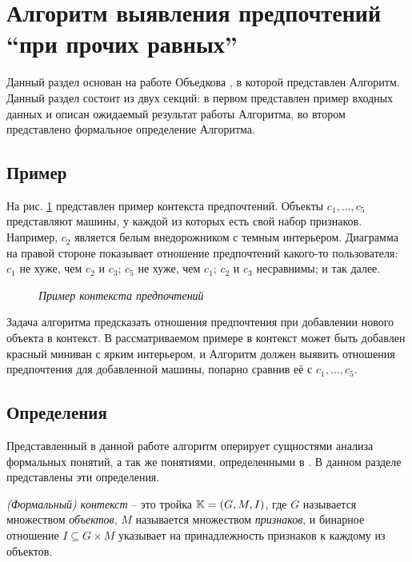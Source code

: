 	
\section{Алгоритм выявления предпочтений \enquote{при прочих равных}}

	Данный раздел основан на работе Объедкова \cite{Obiedkov:2013}, в которой представлен Алгоритм. Данный раздел состоит из двух секций: в первом представлен пример входных данных и описан ожидаемый результат работы Алгоритма, во втором представлено формальное определение Алгоритма.
	
	\subsection{Пример}
		На рис. \ref{fig:pcxt} представлен пример контекста предпочтений. Объекты $c_1, \dots, c_5$ представляют машины, у каждой из которых есть свой набор признаков. Например, $c_2$ является белым внедорожником с темным интерьером. Диаграмма на правой стороне показывает отношение предпочтений какого-то пользователя: $c_1$ не хуже, чем $c_2$ и $c_3$; $c_5$ не хуже, чем $c_1$; $c_2$ и $c_3$ несравнимы; и так далее. 
		\begin{figure}
			\begin{center} 
				\cars \prefs
				\caption{\it Пример контекста предпочтений \cite[Рис.~1.1]{Obiedkov:2013}}
				\label{fig:pcxt}	
			\end{center} 
		\end{figure} 
		
		Задача алгоритма предсказать отношения предпочтения при добавлении нового объекта в контекст. В рассматриваемом примере в контекст может быть добавлен красный миниван с ярким интерьером, и Алгоритм должен выявить отношения предпочтения для добавленной машины, попарно сравнив её с $c_1, \dots, c_5$. 
	
	\subsection{Определения}
		Представленный в данной работе алгоритм оперирует сущностями анализа формальных понятий\cite{Ganter:1999}, а так же понятиями, определенными в \cite{Obiedkov:2012:preferences,Obiedkov:2012:modeling}. В данном разделе представлены эти определения.
		
		
		\begin{definition}
			\emph{(Формальный) контекст} – это тройка $\mathbb{K} = (G, M, I)$, где $G$ называется множеством \emph{объектов}, $M$ называется множеством \emph{признаков}, и бинарное отношение ${I \subseteq G \times M}$ указывает на принадлежность признаков к каждому из объектов.
		\end{definition}
		
